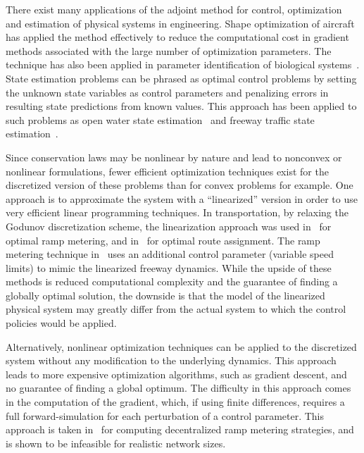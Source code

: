 There exist many applications of the adjoint method for control, optimization and estimation of physical systems in engineering. Shape optimization of aircraft~\cite{Reuther1996,Giles1997,Moin1994} has applied the method effectively to reduce the computational cost in gradient methods associated with the large number of optimization parameters. The technique has also been applied in parameter identification of biological systems~\cite{Raffard2008}. State estimation problems can be phrased as optimal control problems by setting the unknown state variables as control parameters and penalizing errors in resulting state predictions from known values. This approach has been applied to such problems as open water state estimation~\cite{Castaings2006,Strub2009} and freeway traffic state estimation~\cite{Jacqueta}.

Since conservation laws may be nonlinear by nature and lead to nonconvex or nonlinear formulations, fewer efficient optimization techniques exist for the discretized version of these problems than for convex problems for example. One approach is to approximate the system with a ``linearized'' version in order to use very efficient linear programming techniques. In transportation, by relaxing the Godunov discretization scheme, the linearization approach was used in~\cite{gomes2006optimal} for optimal ramp metering, and in~\cite{ziliaskopoulos2000linear} for optimal route assignment. The ramp metering technique in~\cite{Muralidharana} uses an additional control parameter (variable speed limits) to mimic the linearized freeway dynamics. While the upside of these methods is reduced computational complexity and the guarantee of finding a globally optimal solution, the downside is that the model of the linearized physical system may greatly differ from the actual system to which the control policies would be applied.

Alternatively, nonlinear optimization techniques can be applied to the discretized system without any modification to the underlying dynamics. This approach leads to more expensive optimization algorithms, such as gradient descent, and no guarantee of finding a global optimum. The difficulty in this approach comes in the computation of the gradient, which, if using finite differences, requires a full forward-simulation for each perturbation of a control parameter. This approach is taken in~\cite{Ramon2013,Frejo2011} for computing decentralized ramp metering strategies, and is shown to be infeasible for realistic network sizes.

